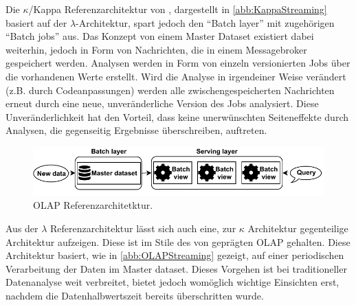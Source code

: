 Die $\kappa$/Kappa Referenzarchitektur von \citeauthor{Kreps.2014}, dargestellt in \autoref{abb:KappaStreaming} basiert auf der $\lambda$-Architektur, spart jedoch den \enquote{Batch layer} mit zugehörigen \enquote{Batch jobs} aus. 
Das Konzept von einem Master Dataset existiert dabei weiterhin, jedoch in Form von Nachrichten, die in einem Messagebroker gespeichert werden. Analysen werden in Form von einzeln versionierten Jobs über die vorhandenen Werte erstellt. 
Wird die Analyse in irgendeiner Weise verändert (z.B. durch Codeanpassungen) werden alle zwischengespeicherten Nachrichten erneut durch eine neue, unveränderliche Version des Jobs analysiert. Diese Unveränderlichkeit hat den Vorteil, dass keine unerwünschten Seiteneffekte durch Analysen, die gegenseitig Ergebnisse überschreiben, auftreten. 



\begin{figure}[H]
\centering
\includegraphics[width=\textwidth]{graphics/OLAP-Reference-Architecture.pdf}
\caption[OLAP Referenzarchitetktur]{OLAP Referenzarchitetktur.\footnotemark}
\label{abb:OLAPStreaming}
\end{figure}

Aus der $\lambda$ Referenzarchitektur lässt sich auch eine, zur $\kappa$ Architektur gegenteilige Architektur aufzeigen. Diese ist im Stile des von \citeauthor{Codd.1993} geprägten \ac{OLAP} gehalten. Diese Architektur basiert, wie in \autoref{abb:OLAPStreaming} gezeigt, auf einer periodischen Verarbeitung der Daten im Master dataset. Dieses Vorgehen ist bei traditioneller Datenanalyse weit verbreitet, bietet jedoch womöglich wichtige Einsichten erst, nachdem die Datenhalbwertszeit bereits überschritten wurde.


